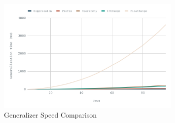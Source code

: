 \begin{figure}[ht]
    \centering
    \includegraphics[width=0.8\textwidth]{images/compare-all.png}
    \caption{Generalizer Speed Comparison}\label{fig:compare_all}
\end{figure}